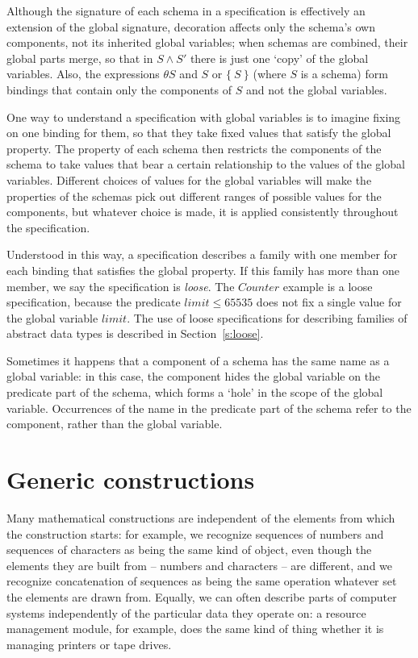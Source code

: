 \new Although the signature of each schema in a specification is
effectively an extension of the global signature, decoration affects
only the schema's own 
components, not its inherited global variables; when schemas are
combined, their global parts merge, so that in $S \land S'$ there is
just one `copy' of the global variables. Also, the expressions
$\theta S$ and $S$ or $\{~S~\}$ (where $S$ is a schema) form bindings
that contain only the components of $S$ and not the global
variables.

\new One way to understand a specification with global variables is
to imagine fixing on one binding for them, so that they take fixed
values that satisfy the global property. The property of each schema
then restricts the components of the schema to take values that bear
a certain relationship to the values of the global variables.
Different choices of values for the global variables will make the
properties of the schemas pick out different ranges of possible
values for the components, but whatever choice is made, it is
applied consistently throughout the specification.

Understood in this way, a specification describes a family with one
member for each binding that satisfies the global property. If this
family has more than one member, we say the specification is {\em
loose}. The $Counter$ example is a loose
specification, because the predicate $limit \leq 65535$ does not fix
a single value for the global variable $limit$. The use of loose
specifications for describing families of abstract data types is
described in Section~\ref{s:loose}.

Sometimes it happens that a component of a schema has the same name as
a global variable: in this case, the component hides the global
variable on the predicate part of the schema, which forms a `hole' in
the scope of the global variable. Occurrences of the name in the
predicate part of the schema refer to the component, rather than the
global variable.%

\section{Generic constructions}\label{s:generics}

Many mathematical constructions are independent of the elements from
which the construction starts: for example, we recognize sequences of
numbers and sequences of characters as being the same kind of object,
even though the elements they are built from -- numbers and characters
-- are different, and we recognize concatenation of sequences as being
the same operation whatever set the elements are drawn from.
Equally, we can often describe parts of computer systems
independently of the particular data they operate on: a resource
management module, for example, does the same kind of thing whether it
is managing printers or tape drives.

